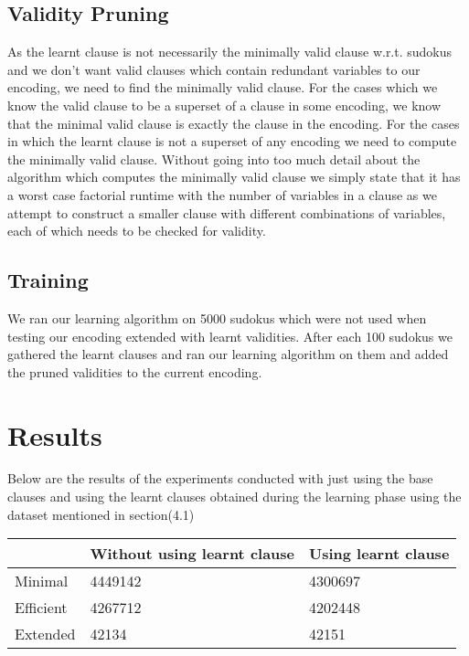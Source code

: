 \documentclass{article}
\begin{document}
\subsection{Validity Pruning} \label{val pruning}
As the learnt clause is not necessarily the minimally valid clause w.r.t. sudokus and we don't want valid clauses which contain redundant variables to our encoding, we need to find the minimally valid clause. For the cases which we know the valid clause to be a superset of a clause in some encoding, we know that the minimal valid clause is exactly the clause in the encoding. For the cases in which the learnt clause is not a superset of any encoding we need to compute the minimally valid clause. Without going into too much detail about the algorithm which computes the minimally valid clause we simply state that it has a worst case factorial runtime with the number of variables in a clause as we attempt to construct a smaller clause with different combinations of variables, each of which needs to be checked for validity.
\subsection{Training} \label{training}
We ran our learning algorithm on 5000 sudokus which were not used when testing our encoding extended with learnt validities. After each 100 sudokus we gathered the learnt clauses and ran our learning algorithm on them and added the pruned validities to the current encoding.

\section{Results} \label{results}

Below are the results of the experiments conducted with just using the base clauses and using the learnt clauses obtained during the learning phase using the dataset mentioned in section(4.1)

\begin{center}
 \label{tab:title}
\begin{tabular}{ | l | l | l |}
    \hline
     & Without using learnt clause & Using learnt clause \\ \hline
    Minimal & 4449142 & 4300697 \\ \hline
    Efficient & 4267712 & 4202448 \\ \hline
    Extended & 42134 & 42151 \\
    \hline
\end{tabular}
\end{center}
\end{document}
